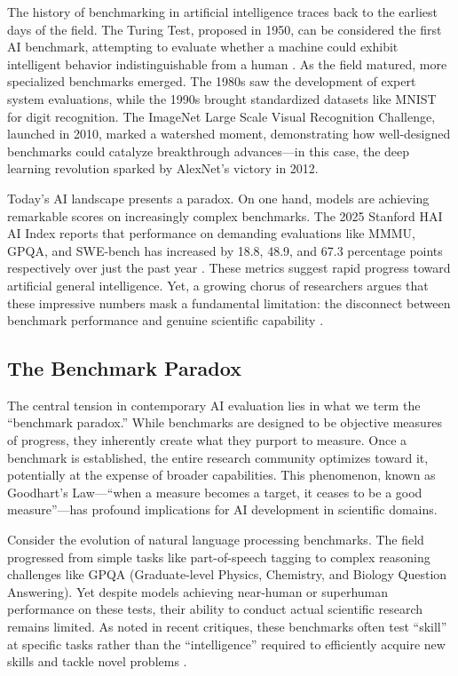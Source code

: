 \documentclass[10pt,twocolumn]{article}
\begin{document}
The history of benchmarking in artificial intelligence traces back to the earliest days of the field. The Turing Test, proposed in 1950, can be considered the first AI benchmark, attempting to evaluate whether a machine could exhibit intelligent behavior indistinguishable from a human \cite{turing1950}. As the field matured, more specialized benchmarks emerged. The 1980s saw the development of expert system evaluations, while the 1990s brought standardized datasets like MNIST for digit recognition. The ImageNet Large Scale Visual Recognition Challenge, launched in 2010, marked a watershed moment, demonstrating how well-designed benchmarks could catalyze breakthrough advances—in this case, the deep learning revolution sparked by AlexNet's victory in 2012.

Today's AI landscape presents a paradox. On one hand, models are achieving remarkable scores on increasingly complex benchmarks. The 2025 Stanford HAI AI Index reports that performance on demanding evaluations like MMMU, GPQA, and SWE-bench has increased by 18.8, 48.9, and 67.3 percentage points respectively over just the past year \cite{stanford2025}. These metrics suggest rapid progress toward artificial general intelligence. Yet, a growing chorus of researchers argues that these impressive numbers mask a fundamental limitation: the disconnect between benchmark performance and genuine scientific capability \cite{reddit2025}.

\subsection{The Benchmark Paradox}

The central tension in contemporary AI evaluation lies in what we term the ``benchmark paradox.'' While benchmarks are designed to be objective measures of progress, they inherently create what they purport to measure. Once a benchmark is established, the entire research community optimizes toward it, potentially at the expense of broader capabilities. This phenomenon, known as Goodhart's Law—``when a measure becomes a target, it ceases to be a good measure''—has profound implications for AI development in scientific domains.

Consider the evolution of natural language processing benchmarks. The field progressed from simple tasks like part-of-speech tagging to complex reasoning challenges like GPQA (Graduate-level Physics, Chemistry, and Biology Question Answering). Yet despite models achieving near-human or superhuman performance on these tests, their ability to conduct actual scientific research remains limited. As noted in recent critiques, these benchmarks often test ``skill'' at specific tasks rather than the ``intelligence'' required to efficiently acquire new skills and tackle novel problems \cite{sde2025}.
\end{document}
